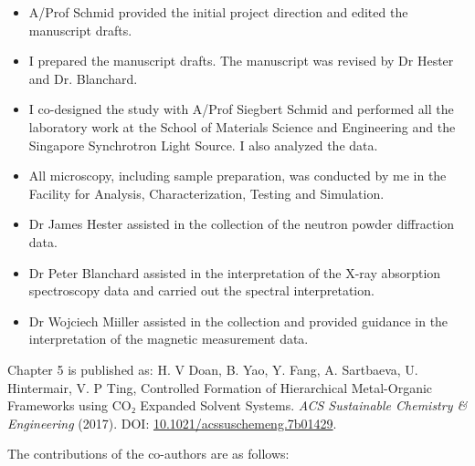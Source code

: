 \begin{itemize}
    \setlength\parskip{0pt} %
    \item \textcolor{DeepGreen}{A/Prof Schmid provided the initial project direction and edited the manuscript drafts.}
    \item \textcolor{DeepGreen}{I prepared the manuscript drafts. The manuscript was revised by Dr Hester and Dr. Blanchard.}
    \item \textcolor{DeepGreen}{I co-designed the study with A/Prof Siegbert Schmid and performed all the laboratory work at the School of Materials Science and Engineering and the Singapore Synchrotron Light Source. I also analyzed the data.}
    \item \textcolor{DeepGreen}{All microscopy, including sample preparation, was conducted by me in the Facility for Analysis, Characterization, Testing and Simulation.}
    \item \textcolor{DeepGreen}{Dr James Hester assisted in the collection of the neutron powder diffraction data.}
    \item \textcolor{DeepGreen}{Dr Peter Blanchard assisted in the interpretation of the X-ray absorption spectroscopy data and carried out the spectral interpretation.}
    \item \textcolor{DeepGreen}{Dr Wojciech Miiller assisted in the collection and provided guidance in the interpretation of the magnetic measurement data.}
\end{itemize}


Chapter 5 is published as:
\textcolor{DeepGreen}{
H. V Doan, B. Yao, Y. Fang, A. Sartbaeva, U. Hintermair, V. P Ting, Controlled Formation of Hierarchical Metal-Organic Frameworks using CO₂ Expanded Solvent Systems. \textit{ACS Sustainable Chemistry \& Engineering} (2017). DOI: \href{https://doi.org/10.1021/acssuschemeng.7b01429}{10.1021/acssuschemeng.7b01429}.
}

\vspace{1cm}

The contributions of the co-authors are as follows:

